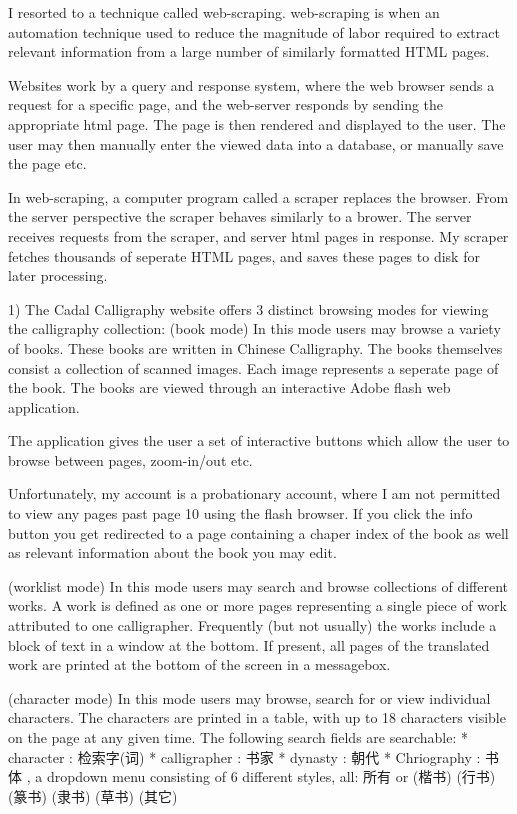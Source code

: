               I resorted to a technique called web-scraping.  web-scraping is when an automation technique used to reduce the magnitude of labor required to extract relevant information from a large number of similarly formatted HTML pages.
    
    Websites work by a query and response system, where the web browser sends a request for a specific page, and the web-server responds by sending the appropriate html page.  The page is then rendered and displayed to the user.  The user may then manually enter the viewed data into a database, or manually save the page etc.
    
    In web-scraping, a computer program called a scraper replaces the browser.  From the server perspective the scraper behaves similarly to a brower.   The server receives requests from the scraper, and server html pages in response.  My scraper fetches thousands of seperate HTML pages, and saves these pages to disk for later processing.
    
    1)  The Cadal Calligraphy website offers 3 distinct browsing modes for viewing the calligraphy collection:
    (book mode)
        In this mode users may browse a variety of books.  These books are written in Chinese Calligraphy.  The books themselves consist a collection of scanned images.  Each image represents a seperate page of the book.  The books are viewed through an interactive Adobe flash web application.
        
        The application gives the user a set of interactive buttons which allow the user to browse between pages, zoom-in/out etc.  
        
        Unfortunately, my account is a probationary account, where I am not permitted to view any pages past page 10 using the flash browser.
        If you click the info button you get redirected to a page containing a chaper index of the book as well as relevant information about the book you may edit.

    (worklist mode)
        In this mode users may search and browse collections of different works.
            A work is defined as one or more pages representing a single piece of work attributed to one calligrapher.
            Frequently (but not usually) the works include a block of text in a window at the bottom.  If present, all pages of the translated work are printed at the bottom of the screen in a messagebox.
            
    (character mode)
        In this mode users may browse, search for or view individual characters.  The characters are printed in a table, with up to 18 characters visible on the page at any given time.  The following search fields are searchable:
            * character : 检索字(词)
            * calligrapher :  书家
            * dynasty :  朝代
            * Chriography :  书体 , a dropdown menu consisting of 6 different styles, all: 所有 or (楷书) (行书) (篆书) (隶书) (草书) (其它)
            
